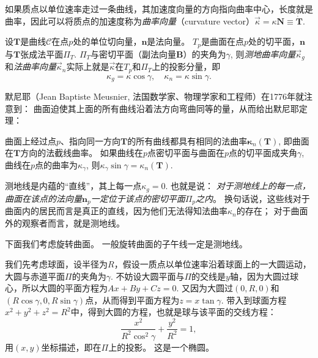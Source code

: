 \documentclass{article}
\begin{document}
如果质点以单位速率走过一条曲线，其加速度向量的方向指向曲率中心，长度就是曲率，因此可以将质点的加速度称为\emph{曲率向量}（curvature vector）$\overrightarrow{\kappa}=\kappa\mathbf{N}\equiv\dot{\mathbf{T}}$.

设$\mathbf{T}$是曲线$\mathcal{C}$在点$p$处的单位切向量，$\mathbf{n}$是法向量。
$T_{p}$是曲面在点$p$处的切平面，$\mathbf{n}$与$\mathbf{T}$张成法平面$\Pi_{T}$.
$\Pi_{T}$与密切平面（副法向量$\mathbf{B}$）的夹角为$\gamma$, 则\emph{测地曲率向量}$\overrightarrow{\kappa}_{g}$和\emph{法曲率向量}$\overrightarrow{\kappa}_{n}$实际上就是$\overrightarrow{\kappa}$在$T_{p}$和$\Pi_{T}$上的投影分量，即
\begin{equation}
    \kappa_{g}=\kappa\cos\gamma, \quad
    \kappa_{n}=\kappa\sin\gamma.
\end{equation}

默尼耶（Jean Baptiste Meusnier, 法国数学家、物理学家和工程师）在1776年就注意到：
曲面迫使其上面的所有曲线沿着法方向弯曲同等的量，从而给出默尼耶定理：
\begin{tcolorbox}[colback=white, arc=3mm, auto outer arc]
\begin{minipage}[c,t]{1.0\textwidth}
\kaishu
曲面上经过点$p$、指向同一方向$\mathbf{T}$的所有曲线都具有相同的法曲率$\mathbf{\kappa}_{n}(\mathbf{T})$, 即曲面在$\mathbf{T}$方向的法截线曲率。
如果曲线在$p$点密切平面与曲面在$p$点的切平面成夹角$\gamma$, 曲线在$p$点的曲率为$\kappa_{\gamma}$, 
则$\kappa_{\gamma}\sin\gamma=\kappa_{n}(\mathbf{T})$.
\end{minipage}
\end{tcolorbox}

测地线是内蕴的“直线”，其上每一点$\kappa_{g}=0$.
也就是说：
\emph{对于测地线上的每一点，曲面在该点的法向量$\mathbf{n}_{p}$一定位于该点的密切平面$\Pi_{p}$之内}。
换句话说，这些线对于曲面内的居民而言是真正的直线，因为他们无法得知法曲率$\kappa_{n}$的存在；
对于曲面外的观察者而言，就是测地线。

下面我们考虑旋转曲面。
一般旋转曲面的子午线一定是测地线。

我们先考虑球面，设半径为$R$，假设一质点以单位速率沿着球面上的一大圆运动，大圆与赤道平面$\Pi$的夹角为$\gamma$.
不妨设大圆平面与$\Pi$的交线是$y$轴，因为大圆过球心，所以大圆的平面方程为$Ax+By+Cz=0$.
又因为大圆过$(0, R, 0)$和$(R\cos\gamma, 0, R\sin\gamma)$点，从而得到平面方程为$z=x\tan\gamma$.
带入到球面方程$x^{2}+y^{2}+z^{2}=R^{2}$中，得到大圆的方程，也就是球与该平面的交线方程：
\begin{equation*}
    \frac{x^{2}}{R^{2}\cos^{2}\gamma}+\frac{y^{2}}{R^{2}}=1,
\end{equation*}
用$(x, y)$坐标描述，即在$\Pi$上的投影。
这是一个椭圆。


%
%
\end{document}
